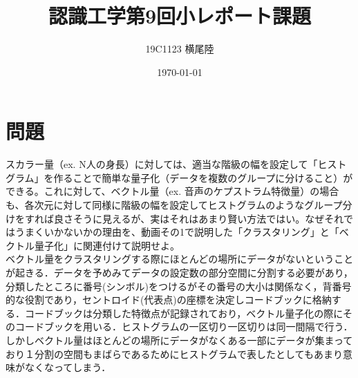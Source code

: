 \documentclass[dvipdfmx]{jsarticle}
\begin{document}
\title{認識工学第9回小レポート課題}
\author{19C1123 横尾陸}
\date{\today}
\maketitle
\section*{問題}
スカラー量（ex. N人の身長）に対しては、適当な階級の幅を設定して「ヒストグラム」を作ることで簡単な量子化（データを複数のグループに分けること）ができる。これに対して、ベクトル量（ex. 音声のケプストラム特徴量）の場合も、各次元に対して同様に階級の幅を設定してヒストグラムのようなグループ分けをすれば良さそうに見えるが、実はそれはあまり賢い方法ではい。なぜそれではうまくいかないかの理由を、動画その1で説明した「クラスタリング」と「ベクトル量子化」に関連付けて説明せよ。\\

ベクトル量をクラスタリングする際にほとんどの場所にデータがないということが起きる．データを予めみてデータの設定数の部分空間に分割する必要があり，分類したところに番号(シンボル)をつけるがその番号の大小は関係なく，背番号的な役割であり，セントロイド(代表点)の座標を決定しコードブックに格納する．コードブックは分類した特徴点が記録されており，ベクトル量子化の際にそのコードブックを用いる．ヒストグラムの一区切り一区切りは同一間隔で行う．しかしベクトル量はほとんどの場所にデータがなくある一部にデータが集まっており１分割の空間もまばらであるためにヒストグラムで表したとしてもあまり意味がなくなってしまう．
\end{document}
